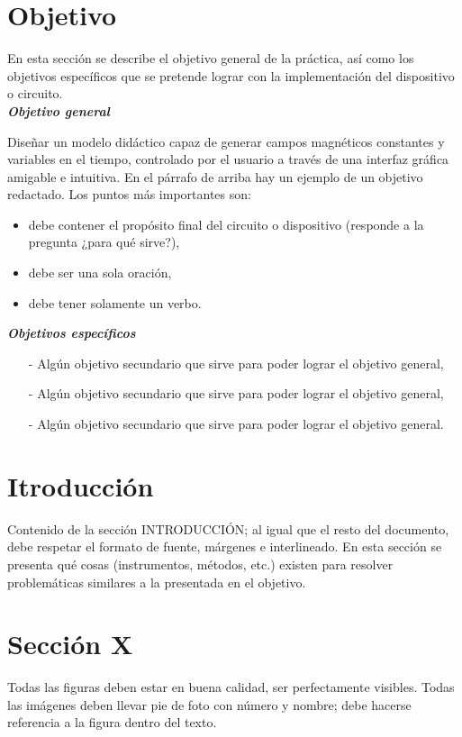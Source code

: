\documentclass[letterpaper, 12pt]{article}
\begin{document}
\section{Objetivo}
En esta sección se describe el objetivo general de la práctica, así como los objetivos específicos que se pretende lograr con la implementación del dispositivo o circuito.\\

\textit{ \textbf{Objetivo general}}

Diseñar un modelo didáctico capaz de generar campos magnéticos constantes y variables en el tiempo, controlado por el usuario a través de una interfaz gráfica amigable e intuitiva.
En el párrafo de arriba hay un ejemplo de un objetivo redactado. Los puntos más importantes son: 

\begin{itemize}

    \item debe contener el propósito final del circuito o dispositivo (responde a la pregunta ¿para qué sirve?),
    \item debe ser una sola oración,
    \item debe tener solamente un verbo.
    \end{itemize}

\textit{ \textbf{Objetivos específicos}}
\begin{itemize}

    \item[-] Algún objetivo secundario que sirve para poder lograr el objetivo general,
    \item[-] Algún objetivo secundario que sirve para poder lograr el objetivo general,
    \item[-] Algún objetivo secundario que sirve para poder lograr el objetivo general.
    \end{itemize}

\section{Itroducción}
Contenido de la sección INTRODUCCIÓN; al igual que el resto del documento, debe respetar el formato de fuente, márgenes e interlineado. En esta sección se presenta qué cosas (instrumentos, métodos, etc.) existen para resolver problemáticas similares a la presentada en el objetivo.

\section{Sección X}
Todas las figuras deben estar en buena calidad, ser perfectamente visibles. Todas las imágenes deben llevar pie de foto con número y nombre; debe hacerse referencia a la figura dentro del texto.
\end{document}

